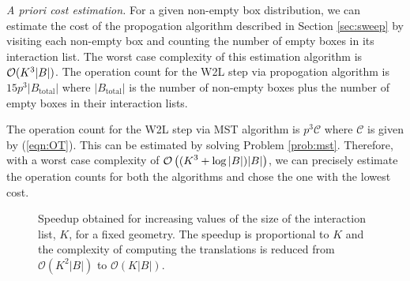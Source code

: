 {\em A priori cost estimation.} For a given non-empty box distribution, we can estimate the cost of the propogation algorithm  described in Section \ref{sec:sweep} by visiting each non-empty box and counting the number of empty boxes in its interaction list. The worst case complexity of this estimation algorithm is $\mathcal{O}(K^3 |B|)$. The operation count for the W2L step via propogation algorithm is $15 p^3 |B_{\text{total}}|$ where $|B_{\text{total}}|$ is the number of non-empty boxes plus the number of empty boxes in their interaction lists. 

The operation count for the W2L step via MST algorithm is $p^3 \mathcal{C}$ where $\mathcal{C}$ is given by (\ref{eqn:OT}). This can be estimated by solving Problem \ref{prob:mst}. Therefore, with a worst case complexity of $\displaystyle \mathcal{O} \left((K^3 + \log |B|) |B|\right)$, we can precisely estimate the operation counts for both the algorithms and chose the one with the lowest cost. 

\begin{figure}
  \caption{Speedup obtained for increasing values of the size of the interaction list, $K$, for a fixed geometry. The speedup is proportional to $K$ and the complexity of computing the translations is reduced from $\mathcal{O}(K^2|B|)$ to $\mathcal{O}(K|B|)$.}  \label{fig:speedup}
\end{figure}  
%


